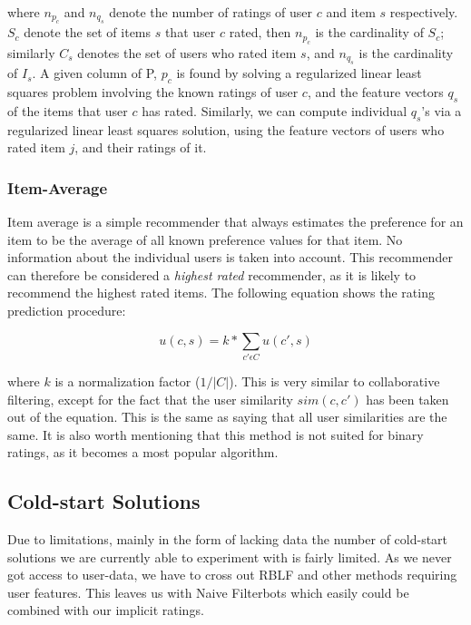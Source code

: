 where $n_{p_{c}}$ and $n_{q_{s}}$ denote the number of ratings of user $c$ and item $s$ respectively. $S_{c}$ denote
the set of items $s$ that user $c$ rated, then $n_{p_{c}}$ is the cardinality of $S_{c}$; similarly $C_{s}$ denotes
the set of users who rated item $s$, and $n_{q_{s}}$ is the cardinality of $I_{s}$. A given column of P, $p_{c}$ is
found by solving a regularized linear least squares problem involving the known ratings of user $c$, and the
feature vectors $q_{s}$ of the items that user $c$ has rated. Similarly, we can compute individual $q_{s}$'s via
a regularized linear least squares solution, using the feature vectors of users who rated item $j$, and their ratings of it.


\subsubsection{Item-Average}

Item average is a simple recommender that always estimates the preference for an item to be the average of
all known preference values for that item. No information about the individual users is taken into account.
This recommender can therefore be considered a \emph{highest rated} recommender, as it is likely to recommend
the highest rated items. The following equation shows the rating prediction procedure:

\begin{equation}
\label{equation:itemaverageratingprediction}
u(c,s) = k * \sum_{c' \epsilon C} u(c',s)
\end{equation}

where $k$ is a normalization factor ($1/|C|$). This is very similar to collaborative filtering, except for
the fact that the user similarity $sim(c, c')$ has been taken out of the equation. This is the same as saying
that all user similarities are the same. It is also worth mentioning that this method is not suited for binary
ratings, as it becomes a most popular algorithm.

\subsection{Cold-start Solutions}

Due to limitations, mainly in the form of lacking data the number of cold-start solutions
we are currently able to experiment with is fairly limited. As we never got access to
user-data, we have to cross out RBLF and other methods requiring user features. This leaves us with
Naive Filterbots \cite{Park2006} which easily could be combined with our implicit ratings.

